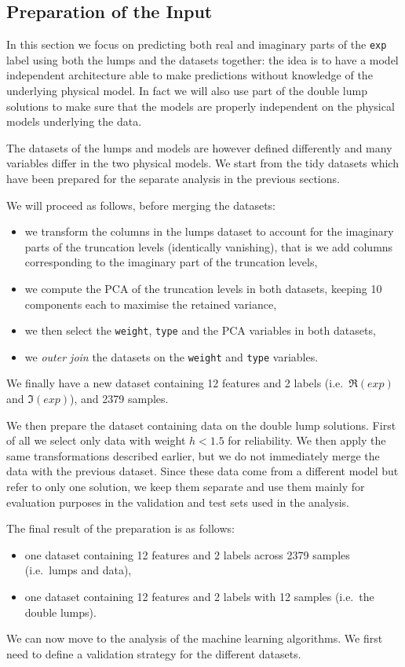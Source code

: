 \subsection{Preparation of the Input}

In this section we focus on predicting both real and imaginary parts of the \texttt{exp} label using both the lumps and the \wzw datasets together: the idea is to have a model independent architecture able to make predictions without knowledge of the underlying physical model.
In fact we will also use part of the double lump solutions to make sure that the \ml models are properly independent on the physical models underlying the data.

The datasets of the lumps and \wzw models are however defined differently and many variables differ in the two physical models.
We start from the tidy datasets which have been prepared for the separate analysis in the previous sections.

We will proceed as follows, before merging the datasets:
\begin{itemize}
  \item we transform the columns in the lumps dataset to account for the imaginary parts of the truncation levels (identically vanishing), that is we add columns corresponding to the imaginary part of the truncation levels,
  \item we compute the PCA of the truncation levels in both datasets, keeping 10 components each to maximise the retained variance,
  \item we then select the \texttt{weight}, \texttt{type} and the PCA variables in both datasets,
  \item we \emph{outer join} the datasets on the \texttt{weight} and \texttt{type} variables.
\end{itemize}
We finally have a new dataset containing 12 features and 2 labels (i.e.\ $\Re(exp)$ and $\Im(exp)$), and 2379 samples.

We then prepare the dataset containing data on the double lump solutions.
First of all we select only data with weight $h < 1.5$ for reliability.
We then apply the same transformations described earlier, but we do not immediately merge the data with the previous dataset.
Since these data come from a different model but refer to only one solution, we keep them separate and use them mainly for evaluation purposes in the validation and test sets used in the analysis.

The final result of the preparation is as follows:
\begin{itemize}
  \item one dataset containing 12 features and 2 labels across 2379 samples (i.e.\ lumps and \wzw data),
  \item one dataset containing 12 features and 2 labels with 12 samples (i.e.\ the double lumps).
\end{itemize}
We can now move to the analysis of the machine learning algorithms.
We first need to define a validation strategy for the different datasets.


